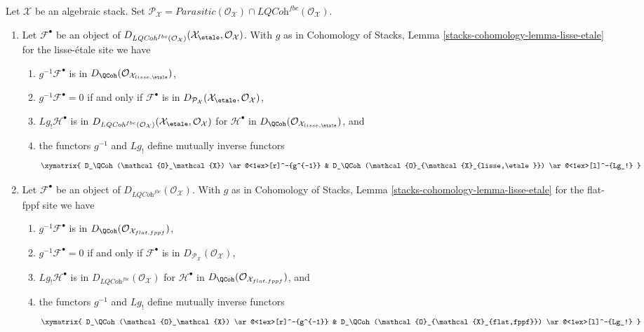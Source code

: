 \begin{lemma}
\label{lemma-derived-quasi-coherent}
Let $\mathcal{X}$ be an algebraic stack. Set
$\mathcal{P}_\mathcal{X} = \textit{Parasitic}(\mathcal{O}_\mathcal{X}) \cap
\textit{LQCoh}^{fbc}(\mathcal{O}_\mathcal{X})$.
\begin{enumerate}
\item
Let $\mathcal{F}^\bullet$ be an object of
$D_{\textit{LQCoh}^{fbc}(\mathcal{O}_\mathcal{X})}
(\mathcal{X}_\etale, \mathcal{O}_\mathcal{X})$.
With $g$ as in
Cohomology of Stacks,
Lemma \ref{stacks-cohomology-lemma-lisse-etale}
for the lisse-\'etale site we have
\begin{enumerate}
\item $g^{-1}\mathcal{F}^\bullet$ is in
$D_\QCoh(\mathcal{O}_{\mathcal{X}_{lisse,\etale}})$,
\item $g^{-1}\mathcal{F}^\bullet = 0$ if and only if
$\mathcal{F}^\bullet$ is in
$D_{\mathcal{P}_\mathcal{X}}(\mathcal{X}_\etale, \mathcal{O}_\mathcal{X})$,
\item $Lg_!\mathcal{H}^\bullet$ is in
$D_{\textit{LQCoh}^{fbc}(\mathcal{O}_\mathcal{X})}(
\mathcal{X}_\etale, \mathcal{O}_\mathcal{X})$
for $\mathcal{H}^\bullet$ in
$D_\QCoh(\mathcal{O}_{\mathcal{X}_{lisse,\etale}})$, and
\item the functors $g^{-1}$ and $Lg_!$ define mutually inverse functors
$$
\xymatrix{
D_\QCoh(\mathcal{O}_\mathcal{X}) \ar@<1ex>[r]^-{g^{-1}} &
D_\QCoh(\mathcal{O}_{\mathcal{X}_{lisse,\etale}})
\ar@<1ex>[l]^-{Lg_!}
}
$$
\end{enumerate}
\item
Let $\mathcal{F}^\bullet$ be an object of
$D_{\textit{LQCoh}^{fbc}}(\mathcal{O}_\mathcal{X})$. With $g$ as in
Cohomology of Stacks,
Lemma \ref{stacks-cohomology-lemma-lisse-etale}
for the flat-fppf site we have
\begin{enumerate}
\item $g^{-1}\mathcal{F}^\bullet$ is in
$D_\QCoh(\mathcal{O}_{\mathcal{X}_{flat, fppf}})$,
\item $g^{-1}\mathcal{F}^\bullet = 0$ if and only if
$\mathcal{F}^\bullet$ is in
$D_{\mathcal{P}_\mathcal{X}}(\mathcal{O}_\mathcal{X})$,
\item $Lg_!\mathcal{H}^\bullet$ is in
$D_{\textit{LQCoh}^{fbc}}(\mathcal{O}_\mathcal{X})$
for $\mathcal{H}^\bullet$ in
$D_\QCoh(\mathcal{O}_{\mathcal{X}_{flat,fppf}})$, and
\item the functors $g^{-1}$ and $Lg_!$ define mutually inverse functors
$$
\xymatrix{
D_\QCoh(\mathcal{O}_\mathcal{X}) \ar@<1ex>[r]^-{g^{-1}} &
D_\QCoh(\mathcal{O}_{\mathcal{X}_{flat,fppf}}) \ar@<1ex>[l]^-{Lg_!}
}
$$
\end{enumerate}
\end{enumerate}
\end{lemma}

